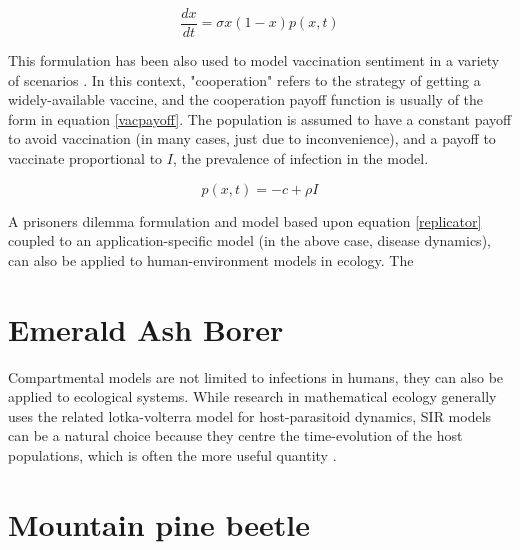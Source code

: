 \begin{equation}
    \frac{dx}{dt} = \sigma x(1 - x)p(x,t) 
    \label{replicator}
\end{equation}


This formulation has been also used to model vaccination sentiment in a variety of scenarios \cite{oraby2014influence,bauch2004vaccination,bauch2005imitation,bauch2012evolutionary}. In this context, "cooperation" refers to the strategy of getting a widely-available vaccine, and the cooperation payoff function is usually of the form in equation \ref{vacpayoff}. The population is assumed to have a constant payoff to avoid vaccination (in many cases, just due to inconvenience), and a payoff to vaccinate proportional to $I$, the prevalence of infection in the model. 

\begin{equation}
    p(x,t) = - c + \rho I
    \label{vacpayoff}
\end{equation}


A prisoners dilemma formulation and model based upon equation \ref{replicator} coupled to an application-specific model (in the above case, disease dynamics), can also be applied to human-environment models in ecology. The  

\section{Emerald Ash Borer}

Compartmental models are not limited to infections in humans, they can also be applied to ecological systems. While research in mathematical ecology generally uses the related lotka-volterra model for host-parasitoid dynamics, SIR models can be a natural choice because they centre the time-evolution of the host populations, which is often the more useful quantity \cite{edelstein2005mathematical}. 


\section{Mountain pine beetle}






